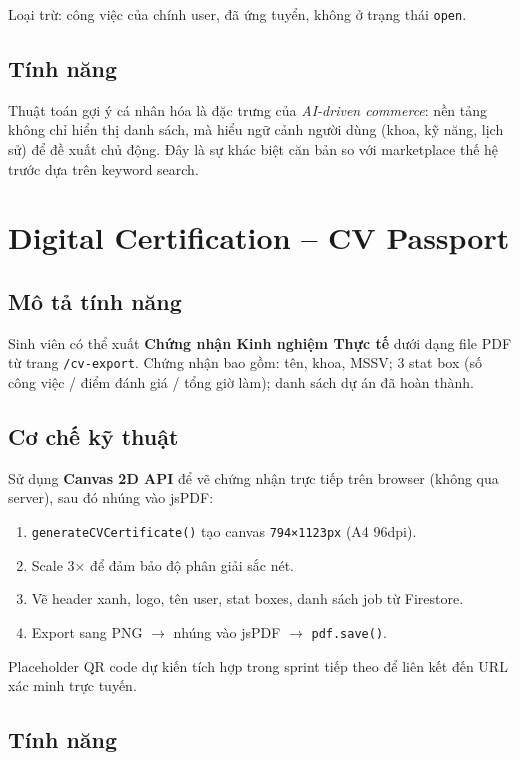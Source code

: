 Loại trừ: công việc của chính user, đã ứng tuyển, không ở trạng thái \texttt{open}.

\subsection*{Tính năng}

Thuật toán gợi ý cá nhân hóa là đặc trưng của \textit{AI-driven commerce}: nền tảng không
chỉ hiển thị danh sách, mà hiểu ngữ cảnh người dùng (khoa, kỹ năng, lịch sử) để đề xuất
chủ động. Đây là sự khác biệt căn bản so với marketplace thế hệ trước dựa trên keyword search.

\section{Digital Certification -- CV Passport}

\subsection*{Mô tả tính năng}

Sinh viên có thể xuất \textbf{Chứng nhận Kinh nghiệm Thực tế} dưới dạng file PDF từ
trang \texttt{/cv-export}. Chứng nhận bao gồm: tên, khoa, MSSV; 3 stat box
(số công việc / điểm đánh giá / tổng giờ làm); danh sách dự án đã hoàn thành.

\subsection*{Cơ chế kỹ thuật}

Sử dụng \textbf{Canvas 2D API} để vẽ chứng nhận trực tiếp trên browser (không qua server),
sau đó nhúng vào jsPDF:

\begin{enumerate}
  \item \texttt{generateCVCertificate()} tạo canvas \texttt{794×1123px} (A4 96dpi).
  \item Scale 3× để đảm bảo độ phân giải sắc nét.
  \item Vẽ header xanh, logo, tên user, stat boxes, danh sách job từ Firestore.
  \item Export sang PNG $\rightarrow$ nhúng vào jsPDF $\rightarrow$ \texttt{pdf.save()}.
\end{enumerate}

Placeholder QR code dự kiến tích hợp trong sprint tiếp theo để liên kết đến
URL xác minh trực tuyến.

\subsection*{Tính năng}

